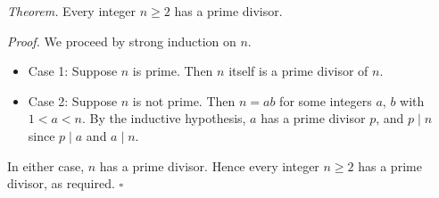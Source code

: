 \textit{Theorem.} Every integer $n \geq 2$ has a prime divisor.

\textit{Proof.} We proceed by strong induction on $n$.

\begin{itemize}
  \item Case 1: Suppose $n$ is prime.
    Then $n$ itself is a prime divisor of $n$.
  \item Case 2: Suppose $n$ is not prime.
    Then $n = ab$ for some integers $a$, $b$ with $1 < a < n$.
    By the inductive hypothesis, $a$ has a prime divisor $p$, and $p \mid n$ since $p \mid a$ and $a \mid n$.
\end{itemize}

In either case, $n$ has a prime divisor.
Hence every integer $n \geq 2$ has a prime divisor, as required. \hfill$\square$